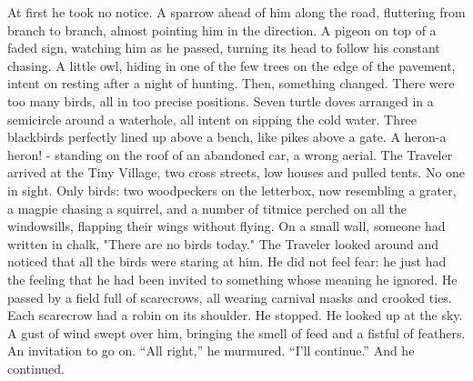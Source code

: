 {At first he took no notice. A sparrow ahead of him along the road, fluttering from branch to branch, almost pointing him in the direction. A pigeon on top of a faded sign, watching him as he passed, turning its head to follow his constant chasing. A little owl, hiding in one of the few trees on the edge of the pavement, intent on resting after a night of hunting.
Then, something changed. 
There were too many birds, all in too precise positions. Seven turtle doves arranged in a semicircle around a waterhole, all intent on sipping the cold water. Three blackbirds perfectly lined up above a bench, like pikes above a gate. A heron-a heron! - standing on the roof of an abandoned car, a wrong aerial.
The Traveler arrived at the Tiny Village, two cross streets, low houses and pulled tents. No one in sight. Only birds: two woodpeckers on the letterbox, now resembling a grater, a magpie chasing a squirrel, and a number of titmice perched on all the windowsills, flapping their wings without flying.
On a small wall, someone had written in chalk, "There are no birds today." 
The Traveler looked around and noticed that all the birds were staring at him. He did not feel fear: he just had the feeling that he had been invited to something whose meaning he ignored.
He passed by a field full of scarecrows, all wearing carnival masks and crooked ties. Each scarecrow had a robin on its shoulder. He stopped. He looked up at the sky. A gust of wind swept over him, bringing the smell of feed and a fistful of feathers. An invitation to go on.
“All right,” he murmured. “I'll continue.”
And he continued.}

